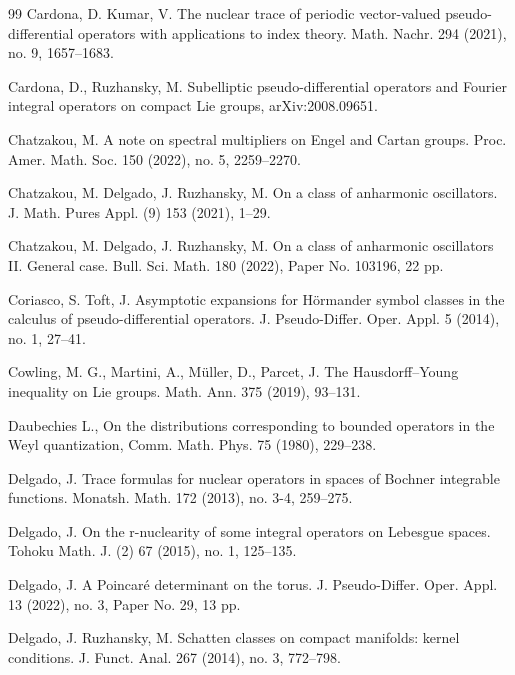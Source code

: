\documentclass[12pt, reqno]{amsart}
\theoremstyle{definition}
\theoremstyle{remark}
\numberwithin{equation}{section}
\begin{document}
\begin{thebibliography}{99}
  Cardona, D. Kumar, V. The nuclear trace of periodic vector-valued pseudo-differential operators with applications to index theory. Math. Nachr. 294 (2021), no. 9, 1657--1683. 

 Cardona, D., Ruzhansky, M. Subelliptic pseudo-differential operators and Fourier integral operators on compact Lie groups, arXiv:2008.09651.


 Chatzakou, M. A note on spectral multipliers on Engel and Cartan groups. Proc. Amer. Math. Soc. 150 (2022), no. 5, 2259–2270.

 Chatzakou, M. Delgado, J. Ruzhansky, M. On a class of anharmonic oscillators. J. Math. Pures Appl. (9) 153 (2021), 1--29. 

 Chatzakou, M. Delgado, J. Ruzhansky, M. On a class of anharmonic oscillators II. General case. Bull. Sci. Math. 180 (2022), Paper No. 103196, 22 pp.




 Coriasco, S. Toft, J. Asymptotic expansions for Hörmander symbol classes in the calculus of pseudo-differential operators. J. Pseudo-Differ. Oper. Appl. 5 (2014), no. 1, 27--41.

 Cowling, M. G., Martini, A., M\"uller, D., Parcet, J. The Hausdorff--Young inequality on Lie groups. Math. Ann. 375 (2019), 93--131.

 Daubechies L., On the distributions corresponding to bounded operators in the Weyl
quantization, Comm. Math. Phys. 75 (1980), 229--238.


  Delgado, J. Trace formulas for nuclear operators in spaces of Bochner integrable functions. Monatsh. Math. 172 (2013), no. 3-4, 259--275.




 Delgado, J. On the r-nuclearity of some integral operators on Lebesgue spaces. Tohoku Math. J. (2) 67 (2015), no. 1, 125--135.


 Delgado, J. A Poincaré determinant on the torus. J. Pseudo-Differ. Oper. Appl. 13 (2022), no. 3, Paper No. 29, 13 pp. 

 Delgado, J. Ruzhansky, M. Schatten classes on compact manifolds: kernel conditions. J. Funct. Anal. 267 (2014), no. 3, 772--798.


\end{thebibliography}
\end{document}
